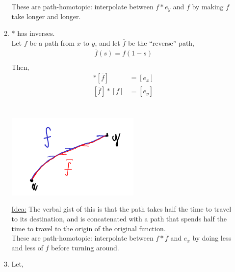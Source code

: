 \begin{enumerate}
\begin{enumerate}
\begin{minipage}[c]{\linewidth}
\begin{center}
                        \end{center}
                    \end{minipage}
                    These are path-homotopic: interpolate between $f*e_y$ and $f$ by making
                    $f$ take longer and longer.
                \item $*$ has inverses.\\
                    Let $f$ be a path from $x$ to $y$, and let $\overline{f}$ be the ``reverse'' path,
                    \begin{align*}
                        \overline{f}(s)=f(1-s)\\
                    \end{align*}
                    Then,
                    \begin{align*}
                        [f]*[\overline{f}]&=[e_x]\\
                        [\overline{f}]*[f]&=[e_y]\\
                    \end{align*}\\
                    \begin{minipage}[c]{\linewidth}
                        \begin{center}
                            \includegraphics[]{images/path_inverse.png}
                        \end{center}
                    \end{minipage}
                    \underline{Idea:} 
                    The verbal gist of this is that the path takes half the time to travel to its destination, and
                    is concatenated with a path that spends half the time to travel to the origin of the original
                    function.\\
                    These are path-homotopic: interpolate between $f*\overline{f}$ and $e_x$ by doing less and less
                    of $f$ before turning around.
                \item Let,
                    \begin{align*}

\end{align*}
\end{enumerate}
\end{enumerate}
